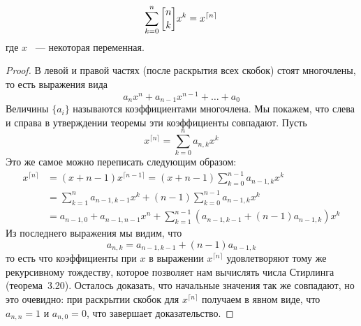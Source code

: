 \begin{thm}
$$\sum_{k=0}^n \fstirling{n}{k}x^k = x^{\lceil n \rceil}$$
где $x$ ~--- некоторая переменная.
\end{thm}
\begin{proof}
В левой и правой частях (после раскрытия всех скобок) стоят многочлены, то есть выражения вида
$$a_n x^n + a_{n-1}x^{n-1} + \ldots + a_{0}$$
Величины $\{a_i\}$ называются коэффициентами многочлена. Мы покажем, что слева и справа в утверждении теоремы эти коэффициенты совпадают. Пусть
$$x^{\lceil n \rceil} = \sum_{k=0}^n a_{n, k} x^k$$
Это же самое можно переписать следующим образом:
\begin{align*}
x^{\lceil n \rceil} &= (x+n-1)x^{\lceil n-1 \rceil} = (x+n-1)\sum_{k=0}^{n-1}a_{n-1, k}x^k \\
& = \sum_{k=1}^n a_{n-1, k-1} x^k + (n-1)\sum_{k=0}^{n-1}a_{n-1,k} x^k \\
& = a_{n-1,0} + a_{n-1, n-1}x^n + \sum_{k=1}^{n-1} (a_{n-1,k-1} + (n-1) a_{n-1, k})x^k
\end{align*}
Из последнего выражения мы видим, что
$$a_{n, k} = a_{n-1, k-1} + (n-1)a_{n-1, k}$$
то есть что коэффициенты при $x$ в выражении $x^{\lceil n \rceil}$ удовлетворяют тому же рекурсивному тождеству, которое позволяет нам вычислять числа Стирлинга (теорема~3.20). Осталось доказать, что начальные значения так же совпадают, но это очевидно: при раскрытии скобок для $x^{\lceil n \rceil}$ получаем в явном виде, что $a_{n, n} = 1$ и $a_{n, 0} = 0$, что завершает доказательство.
\end{proof}